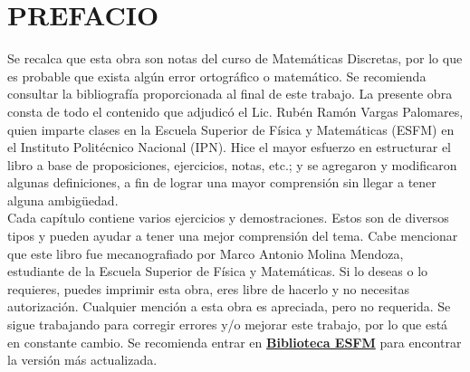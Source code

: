 \newpage

\chapterspaceabove{6.75cm} %
\chapterspacebelow{7.25cm} %


\chapter*{PREFACIO}

Se recalca que esta obra son notas del curso de Matemáticas Discretas, por lo que es probable que exista algún error ortográfico o matemático. Se recomienda consultar la bibliografía proporcionada al final de este trabajo. La presente obra consta de todo el contenido que adjudicó el Lic. Rubén Ramón Vargas Palomares, quien imparte clases en la Escuela Superior de Física y Matemáticas (ESFM) en el Instituto Politécnico Nacional (IPN). Hice el mayor esfuerzo en estructurar el libro a base de proposiciones, ejercicios, notas, etc.; y se agregaron y modificaron algunas definiciones, a fin de lograr una mayor comprensión sin llegar a tener alguna ambigüedad.\\


Cada capítulo contiene varios ejercicios y demostraciones. Estos son de diversos tipos y pueden ayudar a tener una mejor comprensión del tema. Cabe mencionar que este libro fue mecanografiado por Marco Antonio Molina Mendoza, estudiante de la Escuela Superior de Física y Matemáticas. Si lo deseas o lo requieres, puedes imprimir esta obra, eres libre de hacerlo y no necesitas autorización. Cualquier mención a esta obra es apreciada, pero no requerida. Se sigue trabajando para corregir errores y/o mejorar este trabajo, por lo que está en constante cambio. Se recomienda entrar en  \href{https://linktr.ee/biblioteca_esfm}{\textbf{\color{jblueleft}Biblioteca ESFM}} para encontrar la versión más actualizada.

\begin{center}
\end{center}

